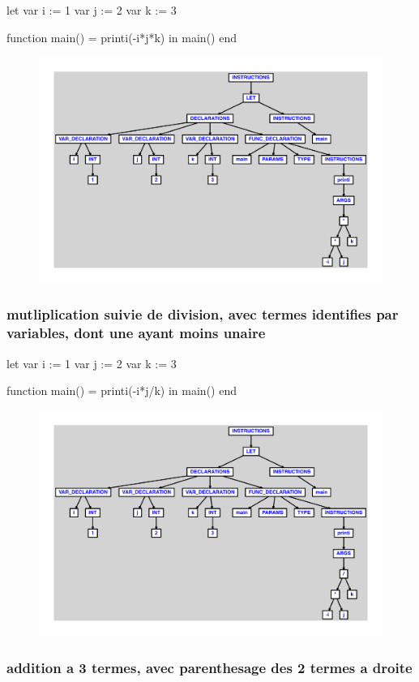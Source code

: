 \documentclass{article}
\begin{document}
\begin{verbatimtab}
let
	var i := 1
	var j := 2
	var k := 3

	function main() = printi(-i*j*k)
in main() end
\end{verbatimtab}
\begin{figure}[H]\centering\includegraphics[max width=\textwidth]{ast/ast_85.pdf}\end{figure}\subsubsection{mutliplication suivie de division, avec termes identifies par variables, dont une ayant moins unaire}
\begin{verbatimtab}
let
	var i := 1
	var j := 2
	var k := 3

	function main() = printi(-i*j/k)
in main() end
\end{verbatimtab}
\begin{figure}[H]\centering\includegraphics[max width=\textwidth]{ast/ast_86.pdf}\end{figure}\subsubsection{addition a 3 termes, avec parenthesage des 2 termes a droite}
\end{document}

